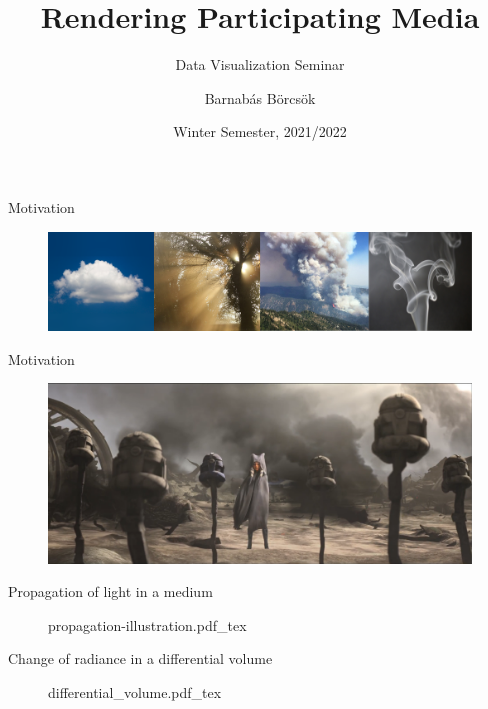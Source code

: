 \documentclass[
  english,            %
  aspectratio=169,    %
]{tumbeamer}
\title{Rendering Participating Media}
\subtitle{Data Visualization Seminar}
\author{Barnabás Börcsök}
\institute{\theChairName\\\theDepartmentName\\\theUniversityName}
\date[WS 2021/2022]{Winter Semester, 2021/2022}
\newcommand{\incfig}[1]{%
    \def\svgwidth{\columnwidth}
    {#1.pdf_tex}
}
\begin{document}
\maketitle

\begin{frame}{Motivation}
  \begin{figure}
      \centering
      \includegraphics{img/teaser.png}
      \label{fig:teaser}
  \end{figure}
\end{frame}


\begin{frame}{Motivation}
  \begin{figure}
      \centering
      \includegraphics[width=\textwidth]{img/ahsoka-smoke.png}
      \label{fig:teaser}
  \end{figure}
\end{frame}

\begin{frame}{Propagation of light in a medium}
  \begin{figure}[ht]
      \centering
      \def\svgwidth{0.7\columnwidth}
      {propagation-illustration.pdf_tex}
  \end{figure}
\end{frame}

\begin{frame}{Change of radiance in a differential volume}
    \begin{figure}[ht]
        \centering
        \incfig{differential_volume}
        \label{fig:vre}
    \end{figure}
\end{frame}
\end{document}

